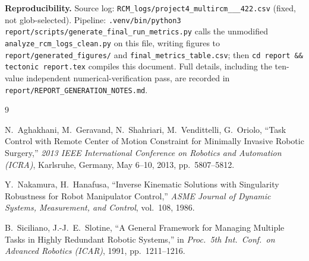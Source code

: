 \documentclass[11pt,a4paper]{article}
\newcommand{\code}[1]{\texttt{#1}}
\begin{document}
\textbf{Reproducibility.} Source log: \texttt{RCM\_logs/\allowbreak project4\_\allowbreak multircm\_\_\_422.csv} (fixed, not glob-selected). Pipeline: \texttt{.venv/\allowbreak bin/\allowbreak python3 report/\allowbreak scripts/\allowbreak generate\_\allowbreak final\_\allowbreak run\_\allowbreak metrics.py} calls the unmodified \code{analyze\_\allowbreak rcm\_\allowbreak logs\_\allowbreak clean.py} on this file, writing figures to \code{report/\allowbreak generated\_\allowbreak figures/} and \code{final\_\allowbreak metrics\_\allowbreak table.csv}; then \texttt{cd report \&\& tectonic report.tex} compiles this document. Full details, including the ten-value independent numerical-verification pass, are recorded in \texttt{report/\allowbreak REPORT\_\allowbreak GENERATION\_\allowbreak NOTES.md}.

\begin{thebibliography}{9}

N.~Aghakhani, M.~Geravand, N.~Shahriari, M.~Vendittelli, G.~Oriolo,
``Task Control with Remote Center of Motion Constraint for Minimally Invasive Robotic Surgery,''
\emph{2013 IEEE International Conference on Robotics and Automation (ICRA)}, Karlsruhe, Germany, May 6--10, 2013, pp.~5807--5812.

Y.~Nakamura, H.~Hanafusa,
``Inverse Kinematic Solutions with Singularity Robustness for Robot Manipulator Control,''
\emph{ASME Journal of Dynamic Systems, Measurement, and Control}, vol.~108, 1986.

B.~Siciliano, J.-J.~E.~Slotine,
``A General Framework for Managing Multiple Tasks in Highly Redundant Robotic Systems,''
in \emph{Proc.\ 5th Int.\ Conf.\ on Advanced Robotics (ICAR)}, 1991, pp.~1211--1216.

\end{thebibliography}
\end{document}
